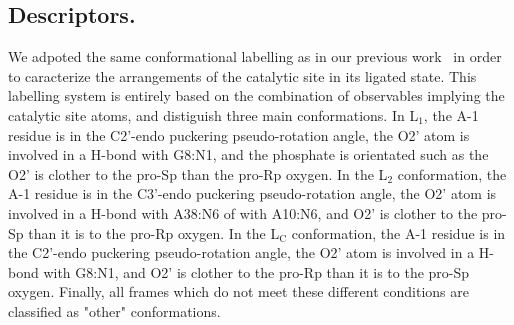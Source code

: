 \documentclass[journal=jacsat,manuscript=article]{achemso}
\begin{document}
\subsection{Descriptors.}

We adpoted the same conformational labelling as in our previous work~\cite{forget2024simulation} in order to 
caracterize the arrangements of the catalytic site in its ligated state.
This labelling system is entirely based on the combination of observables implying the catalytic site atoms, 
and distiguish three main conformations.
In L$_\mathrm{1}$, the A-1 residue is in the C2'-endo puckering pseudo-rotation angle,
the O2' atom is involved in a H-bond with G8:N1, 
and the phosphate is orientated such as the O2' is clother to the pro-Sp than the pro-Rp oxygen.
In the L$_\mathrm{2}$ conformation, the A-1 residue is in the C3'-endo puckering pseudo-rotation angle,
the O2' atom is involved in a H-bond with A38:N6 of with A10:N6, 
and O2' is clother to the pro-Sp than it is to the pro-Rp oxygen.
In the L$_\mathrm{C}$ conformation, the A-1 residue is in the C2'-endo puckering pseudo-rotation angle,
the O2' atom is involved in a H-bond with G8:N1,
and O2' is clother to the pro-Rp than it is to the pro-Sp oxygen.
Finally, all frames which do not meet these different conditions are classified as "other" conformations.



\end{document}
